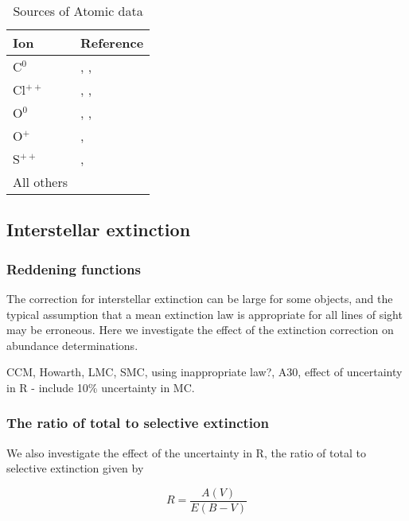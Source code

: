 \documentclass[useAMS,usenatbib]{mn2e}
\begin{document}
\begin{table}
        \centering
        \caption{Sources of Atomic data}
        \begin{tabular}{p{0.8cm}|p{6.5cm}}
        Ion &  Reference\\
        \hline
        C$^0$      &    \citet{1976AA....50..141P}, \citet{1987JPhB...20.2553J}, \citet{1979AA....72..129N} \\ 
        Cl$^{++}$  &    \citet{1982MNRAS.198..127M}, \citet{1989AA...208..337B},  \\
        O$^0$      &    \citet{1981PSS...29..377B}, \citet{1988JPhB...21.1083B}, \citet{1988JPhB...21.1455B} \\
        O$^{+}$   &    \citet{1976MNRAS.177...31P}, \citet{1982MNRAS.198..111Z}\\
        S$^{++}$   &    \citet{1982MNRAS.199.1025M}, \citet{1983IAUS..103..143M}        \\
        All others &    \citet{2006ApJS..162..261L} \\
        \end{tabular}
 \label{AD_reftable}    
\end{table}

\subsection{Interstellar extinction}
\subsubsection{Reddening functions}

The correction for interstellar extinction can be large for some objects, and the typical assumption that a mean extinction law is appropriate for all lines of sight may be erroneous.  Here we investigate the effect of the extinction correction on abundance determinations.

CCM, Howarth, LMC, SMC, using inappropriate law?, A30, effect of uncertainty in R - include 10\% uncertainty in MC.

\subsubsection{The ratio of total to selective extinction}

We also investigate the effect of the uncertainty in R, the ratio of total to selective extinction given by

\begin{equation}
R = \frac{A(V)}{E(B-V)}
\end{equation}
\end{document}
